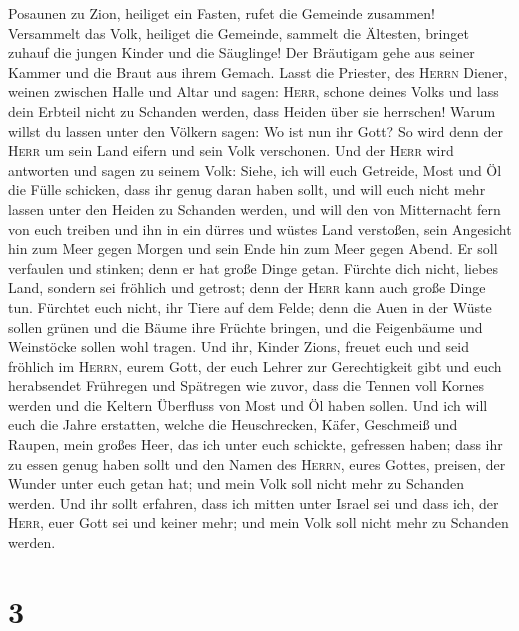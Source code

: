 Posaunen zu Zion, heiliget ein Fasten, rufet die Gemeinde zusammen!
 Versammelt das Volk, heiliget die Gemeinde, sammelt die
Ältesten, bringet zuhauf die jungen Kinder und die Säuglinge! Der
Bräutigam gehe aus seiner Kammer und die Braut aus ihrem Gemach.
 Lasst die Priester, des \textsc{Herrn} Diener, weinen
zwischen Halle und Altar und sagen: \textsc{Herr}, schone deines Volks
und lass dein Erbteil nicht zu Schanden werden, dass Heiden über sie
herrschen! Warum willst du lassen unter den Völkern sagen: Wo ist nun
ihr Gott?  So wird denn der \textsc{Herr} um sein Land
eifern und sein Volk verschonen.  Und der \textsc{Herr}
wird antworten und sagen zu seinem Volk: Siehe, ich will euch Getreide,
Most und Öl die Fülle schicken, dass ihr genug daran haben sollt, und
will euch nicht mehr lassen unter den Heiden zu Schanden werden,
 und will den von Mitternacht fern von euch treiben und
ihn in ein dürres und wüstes Land verstoßen, sein Angesicht hin zum Meer
gegen Morgen und sein Ende hin zum Meer gegen Abend. Er soll verfaulen
und stinken; denn er hat große Dinge getan.  Fürchte dich
nicht, liebes Land, sondern sei fröhlich und getrost; denn der
\textsc{Herr} kann auch große Dinge tun.  Fürchtet euch
nicht, ihr Tiere auf dem Felde; denn die Auen in der Wüste sollen grünen
und die Bäume ihre Früchte bringen, und die Feigenbäume und Weinstöcke
sollen wohl tragen.  Und ihr, Kinder Zions, freuet euch
und seid fröhlich im \textsc{Herrn}, eurem Gott, der euch Lehrer zur
Gerechtigkeit gibt und euch herabsendet Frühregen und Spätregen wie
zuvor,  dass die Tennen voll Kornes werden und die
Keltern Überfluss von Most und Öl haben sollen.  Und ich
will euch die Jahre erstatten, welche die Heuschrecken, Käfer, Geschmeiß
und Raupen, mein großes Heer, das ich unter euch schickte, gefressen
haben;  dass ihr zu essen genug haben sollt und den Namen
des \textsc{Herrn}, eures Gottes, preisen, der Wunder unter euch getan
hat; und mein Volk soll nicht mehr zu Schanden werden. 
Und ihr sollt erfahren, dass ich mitten unter Israel sei und dass ich,
der \textsc{Herr}, euer Gott sei und keiner mehr; und mein Volk soll
nicht mehr zu Schanden werden.

\hypertarget{section-2}{%
\section{3}\label{section-2}}

